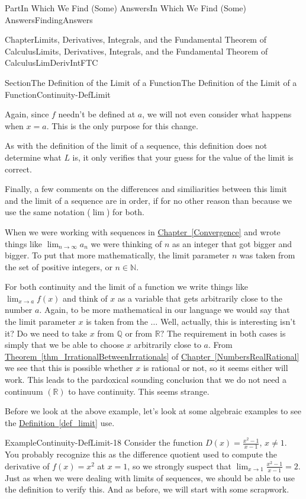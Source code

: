 \documentclass[oneside,10pt,]{book}
\newcommand{\xreffont}{\relax}
\numberwithin{equation}{part}
\def\limit#1#2#3{{\displaystyle\lim_{#1\rightarrow #2}#3}}
\newcommand{\RR}{\mathbb {R}}
\newcommand{\QQ}{\mathbb {Q}}
\newcommand{\NN}{\mathbb {N}}
\begin{document}
\begin{partptx}{Part}{In Which We Find (Some) Answers}{}{In Which We Find (Some) Answers}{}{}{FindingAnswers}
\begin{chapterptx}{Chapter}{Limits, Derivatives, Integrals, and the Fundamental Theorem of Calculus}{}{Limits, Derivatives, Integrals, and the Fundamental Theorem of Calculus}{}{}{LimDerivIntFTC}
\begin{sectionptx}{Section}{The Definition of the Limit of a Function}{}{The Definition of the Limit of a Function}{}{}{Continuity-DefLimit}
%
\par
Again, since \(f\) needn't be defined at \(a\), we will not even consider what happens when \(x=a\).  This is the only purpose for this change.%
\par
As with the definition of the limit of a sequence, this definition does not determine what \(L\) is, it only verifies that your guess for the value of the limit is correct.%
\par
Finally, a few comments on the differences and similiarities between this limit and the limit of a sequence are in order, if for no other reason than because we use the same notation (\(\lim\)) for both.%
\par
When we were working with sequences in \hyperref[Convergence]{Chapter~{\xreffont\ref{Convergence}}} and wrote things like \(\limit{n}{\infty}{a_n}\) we were thinking of \(n\) as an integer that got bigger and bigger. To put that more mathematically, the limit parameter \(n\) was taken from the set of positive integers, or \(n\in \NN\).%
\par
For both continuity and the limit of a function we write things like \(\limit{x}{a}{f(x)}\) and think of \(x\) as a variable that gets arbitrarily close to the number \(a\).  Again, to be more mathematical in our language we would say that the limit parameter \(x\) is taken from the \(\ldots\) Well, actually, this is interesting isn't it?  Do we need to take \(x\) from \(\QQ\) or from \(\RR?\) The requirement in both cases is simply that we be able to choose \(x\) arbitrarily close to \(a\).  From \hyperref[thm_IrrationalBetweenIrrationals]{Theorem~{\xreffont\ref{thm_IrrationalBetweenIrrationals}}} of \hyperref[NumbersRealRational]{Chapter~{\xreffont\ref{NumbersRealRational}}} we see that this is possible whether \(x\) is rational or not, so it seems either will work.  This leads to the pardoxical sounding conclusion that we do not need a continuum \((\RR)\) to have continuity. This seems strange.%
\par
Before we look at the above example, let's look at some algebraic examples to see the \hyperref[def_limit]{Definition~{\xreffont\ref{def_limit}}}  use.%
\begin{example}{Example}{}{Continuity-DefLimit-18}%
Consider the function \(D(x)=\frac{x^2-1}{x-1}\), \(x\neq 1\).  You probably recognize this as the difference quotient used to compute the derivative of \(f(x)=x^2\) at \(x=1\), so we strongly suspect that \(\limit{x}{1}{\frac{x^2-1}{x-1}}=2\). Just as when we were dealing with limits of sequences, we should be able to use the definition to verify this.  And as before, we will start with some scrapwork.%

\end{example}
\end{sectionptx}
\end{chapterptx}
\end{partptx}
\end{document}

